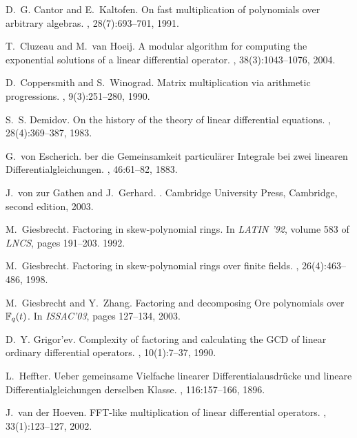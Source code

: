 \documentclass{sig-alt-full}
\def\gathen#1{{#1}}
\def\hoeven#1{{#1}}
\begin{document}
\begin{thebibliography}{10}
D.~G. Cantor and E.~Kaltofen.
\newblock On fast multiplication of polynomials over arbitrary algebras.
, 28(7):693--701, 1991.

T.~Cluzeau and M.~van Hoeij.
\newblock A modular algorithm for computing the exponential solutions of a
  linear differential operator.
, 38(3):1043--1076, 2004.

D.~Coppersmith and S.~Winograd.
\newblock Matrix multiplication via arithmetic progressions.
, 9(3):251--280, 1990.

S.~S. Demidov.
\newblock On the history of the theory of linear differential equations.
, 28(4):369--387, 1983.

G.~\gathen{von} Escherich.
ber die {G}emeinsamkeit particul{\"a}rer {I}nte\-grale bei zwei
  linearen {D}ifferentialgleichungen.
, 46:61--82, 1883.

J.~\gathen{von zur} Gathen and J.~Gerhard.
.
\newblock Cambridge University Press, Cambridge, second edition, 2003.

M.~Giesbrecht.
\newblock Factoring in skew-polynomial rings.
\newblock In {\em LATIN '92}, volume 583 of {\em LNCS}, pages 191--203. 1992.

M.~Giesbrecht.
\newblock Factoring in skew-polynomial rings over finite fields.
, 26(4):463--486, 1998.

M.~Giesbrecht and Y.~Zhang.
\newblock Factoring and decomposing {O}re polynomials over {$\Bbb F_q(t)$}.
\newblock In {\em ISSAC'03}, pages 127--134, 2003.

D.~Y. Grigor'ev.
\newblock Complexity of factoring and calculating the {GCD} of linear ordinary
  differential operators.
, 10(1):7--37, 1990.

L.~Heffter.
\newblock Ueber gemeinsame {V}ielfache linearer {D}ifferentialausdr{\"u}cke und
  lineare {D}ifferentialgleichungen derselben {K}lasse.
, 116:157--166, 1896.

J.~\hoeven{van der} Hoeven.
\newblock F{FT}-like multiplication of linear differential operators.
, 33(1):123--127, 2002.


\end{thebibliography}
\end{document}
